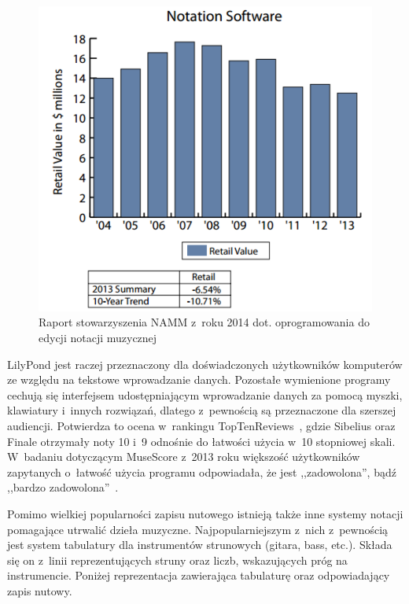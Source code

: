 \documentclass[polish,thesis,12pt]{dcsbook}
\begin{document}
\begin{figure}[H]
  \centering
  \includegraphics[scale=1.0,bb=0 0 394 361]{img/namm.pdf}
  \caption{Raport stowarzyszenia NAMM z~roku 2014 dot. oprogramowania do edycji notacji muzycznej~\label{namm}
    \cite{NAMM}}
\end{figure}

LilyPond jest raczej przeznaczony dla doświadczonych użytkowników komputerów ze względu na tekstowe wprowadzanie danych. Pozostałe wymienione programy cechują się interfejsem udostępniającym wprowadzanie danych za pomocą myszki, klawiatury i~innych rozwiązań, dlatego z~pewnością są przeznaczone dla szerszej audiencji. Potwierdza to ocena w~rankingu TopTenReviews~\cite{TopTenReviews}, gdzie Sibelius oraz Finale otrzymały noty 10 i~9 odnośnie do łatwości użycia w~10 stopniowej skali. W~badaniu dotyczącym MuseScore z~2013 roku większość użytkowników zapytanych o~łatwość użycia programu odpowiadała, że jest ,,zadowolona'', bądź ,,bardzo zadowolona''~\cite{MuseScoreSurvey}.

Pomimo wielkiej popularności zapisu nutowego istnieją także inne systemy notacji pomagające utrwalić dzieła muzyczne. Najpopularniejszym z~nich z~pewnością jest system tabulatury dla instrumentów strunowych (gitara, bass, etc.). Składa się on z~linii reprezentujących struny oraz liczb, wskazujących próg na instrumencie. Poniżej reprezentacja zawierająca tabulaturę oraz odpowiadający zapis nutowy.
\end{document}
